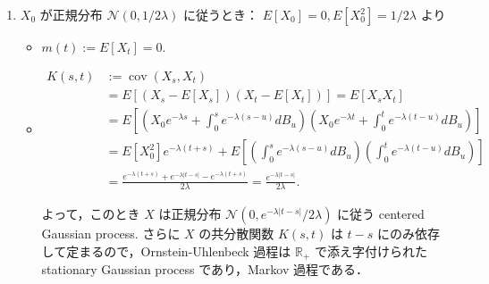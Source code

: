 \documentclass{jsarticle}
\begin{document}
\begin{enumerate}[label=(\roman*)]
    \item
    $X_{0}$ が正規分布 $\mathcal{N}(0, 1/2\lambda)$ に従うとき：
    $E[X_0]=0, E[X_0^2]=1/2\lambda$ より
    \begin{itemize}
        \item 
        $m(t):=E[X_t]=0.$
        \item 
        \begin{align}
            K(s, t)
            &:= \operatorname{cov}(X_{s}, X_{t}) \\
            &= E[(X_s-E[X_s])(X_t-E[X_t])]
            = E[X_s X_t] \\
            &= E[(X_0e^{-\lambda s}+\int_{0}^{s}e^{-\lambda(s-u)}dB_{u})
            (X_0e^{-\lambda t}+\int_{0}^{t}e^{-\lambda(t-u)}dB_{u})] \\
            &= E[X_0^2]e^{-\lambda(t+s)}
            + E[(\int_{0}^{s}e^{-\lambda(s-u)}dB_{u})(\int_{0}^{t}e^{-\lambda(t-u)}dB_{u})] \\
            &= \frac{e^{-\lambda(t+s)}+e^{-\lambda\lvert t-s\rvert}-e^{-\lambda(t+s)}}{2\lambda}
            = \frac{e^{-\lambda\lvert t-s\rvert}}{2\lambda}.
        \end{align}

        よって，このとき $X$ は正規分布 $\mathcal{N}(0, e^{-\lambda\lvert t-s\rvert}/2\lambda)$ に従う centered Gaussian process.
        さらに $X$ の共分散関数 $K(s, t)$ は $t-s$ にのみ依存して定まるので，Ornstein-Uhlenbeck 過程は $\mathbb{R}_+$ で添え字付けられた stationary Gaussian process であり，Markov 過程である．
    \end{itemize}
\end{enumerate}
\end{document}
